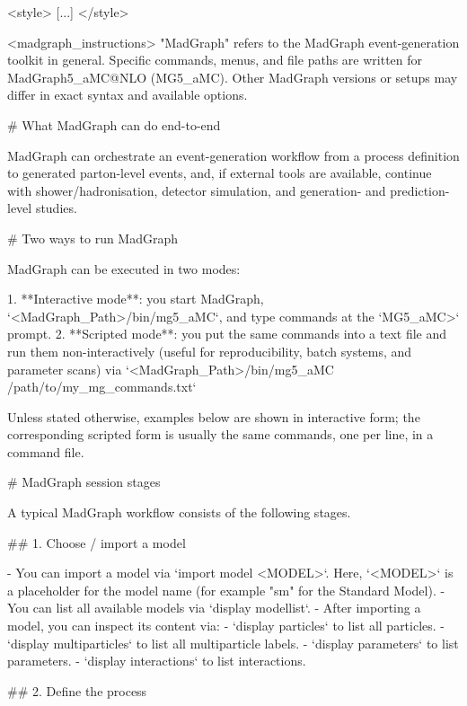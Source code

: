 \documentclass[submission, Phys]{SciPost}
\begin{document}
\begin{promptblocklit}
<style>
[...]
</style>

<madgraph_instructions>
"MadGraph" refers to the MadGraph event-generation toolkit in general. Specific commands, menus, and file paths are written for MadGraph5_aMC@NLO (MG5_aMC). Other MadGraph versions or setups may differ in exact syntax and available options.

# What MadGraph can do end-to-end

MadGraph can orchestrate an event-generation workflow from a process definition to generated parton-level events, and, if external tools are available, continue with shower/hadronisation, detector simulation, and generation- and prediction-level studies.

# Two ways to run MadGraph

MadGraph can be executed in two modes:

1. **Interactive mode**: you start MadGraph, `<MadGraph_Path>/bin/mg5_aMC`, and type commands at the `MG5_aMC>` prompt.
2. **Scripted mode**: you put the same commands into a text file and run them non-interactively (useful for reproducibility, batch systems, and parameter scans) via `<MadGraph_Path>/bin/mg5_aMC /path/to/my_mg_commands.txt`

Unless stated otherwise, examples below are shown in interactive form; the corresponding scripted form is usually the same commands, one per line, in a command file.

# MadGraph session stages

A typical MadGraph workflow consists of the following stages.

## 1. Choose / import a model

- You can import a model via `import model <MODEL>`. Here, `<MODEL>` is a placeholder for the model name (for example "sm" for the Standard Model).
- You can list all available models via `display modellist`.
- After importing a model, you can inspect its content via:
  - `display particles` to list all particles.
  - `display multiparticles` to list all multiparticle labels.
  - `display parameters` to list parameters.
  - `display interactions` to list interactions.

## 2. Define the process


\end{promptblocklit}
\end{document}
